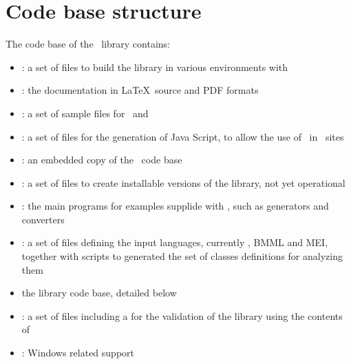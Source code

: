 



\chapter{Code base structure}

The code base of the \mf\ library contains:
\begin{itemize}
\item {} : a set of files to build the library in various environments with \make
\item {} : the documentation in \LaTeX\ source and PDF formats
\item {} : a set of sample files for \mxml\ and \msdlLang
\item {} : a set of files for the generation of Java Script, to allow the use of \mf\ in \Web\ sites
\item {} : an embedded copy of the \libmusicxml\ code base
\item {} : a set of files to create installable versions of the library, not yet operational %
\item {} : the main programs for examples supplide with \mf, such as generators and converters
\item {} : a set of files defining the input languages, currently \mxml, BMML and MEI, together with scripts to generated the set of classes definitions for analyzing them
\item {} the library code base, detailed below
\item {} : a set of files including a  for the validation of the library using the contents of 
\item {} : Windows related support
\end{itemize}


